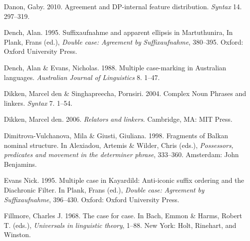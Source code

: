 \documentclass[output=paper]{langsci/langscibook}
\begin{document}
\begin{styleSfondomedioiColorexxi}
Danon, Gaby. 2010. Agreement and DP-internal feature distribution. \textit{Syntax} 14. 297–319. 
\end{styleSfondomedioiColorexxi}

\begin{styleSfondomedioiColorexxi}
Dench, Alan. 1995. Suffixaufnahme and apparent ellipsis in Martuthunira, In Plank, Frans (ed.), \textit{Double case: Agreement by} \textit{Suffixaufnahme}, 380–395. Oxford: Oxford University Press.
\end{styleSfondomedioiColorexxi}

\begin{styleSfondomedioiColorexxi}
Dench, Alan \& Evans, Nicholas. 1988. Multiple case-marking in Australian languages. \textit{Australian Journal of Linguistics} 8. 1–47.
\end{styleSfondomedioiColorexxi}

\begin{styleSfondomedioiColorexxi}
Dikken, Marcel den \& Singhapreecha, Pornsiri. 2004. Complex Noun Phrases and linkers. \textit{Syntax} 7. 1–54.
\end{styleSfondomedioiColorexxi}

\begin{styleSfondomedioiColorexxi}
Dikken, Marcel den. 2006. \textit{Relators and linkers}. Cambridge, MA: MIT Press.
\end{styleSfondomedioiColorexxi}

\begin{styleSfondomedioiColorexxi}
Dimitrova-Vulchanova, Mila \& Giusti, Giuliana. 1998. Fragments of Balkan nominal structure. In Alexiadou, Artemis \& Wilder, Chris (eds.), \textit{Possessors, predicates and movement in the determiner phrase}, 333–360. Amsterdam: John Benjamins. 
\end{styleSfondomedioiColorexxi}

\begin{styleSfondomedioiColorexxi}
Evans Nick. 1995. Multiple case in Kayardild: Anti-iconic suffix ordering and the Diachronic Filter. In Plank, Frans (ed.), \textit{Double case: Agreement by} \textit{Suffixaufnahme}, 396–430. Oxford: Oxford University Press.
\end{styleSfondomedioiColorexxi}

\begin{styleSfondomedioiColorexi}
Fillmore, Charles J. 1968. The case for case. In Bach, Emmon \& Harms, Robert T. (eds.), \textit{Universals in linguistic theory}, 1–88. New York: Holt, Rinehart, and Winston. 
\end{styleSfondomedioiColorexi}
\end{document}
